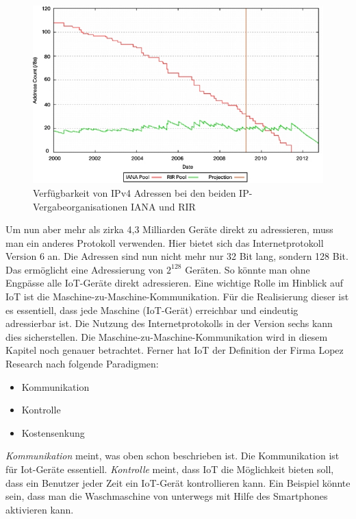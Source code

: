 \begin{figure}
\includegraphics[scale=0.7]{bilder/ipv4cisco} 
\caption{Verfügbarkeit von IPv4 Adressen bei den beiden IP-Vergabeorganisationen IANA und RIR \cite{cisco}}
\label{IPv4}
\end{figure}


Um nun aber mehr als zirka 4,3 Milliarden Geräte direkt zu adressieren, muss man ein anderes Protokoll verwenden. Hier bietet sich das Internetprotokoll Version 6 an. Die Adressen sind nun nicht mehr nur 32 Bit lang, sondern 128 Bit. Das ermöglicht eine Adressierung von $2^{128}$ Geräten. So könnte man ohne Engpässe alle IoT-Geräte direkt adressieren. 
Eine wichtige Rolle im Hinblick auf IoT ist die Maschine-zu-Maschine-Kommunikation. Für die Realisierung dieser ist es essentiell, dass jede Maschine (IoT-Gerät) erreichbar und eindeutig adressierbar ist. Die Nutzung des Internetprotokolls in der Version sechs kann dies sicherstellen. Die Maschine-zu-Maschine-Kommunikation wird in diesem Kapitel noch genauer betrachtet.     
Ferner hat IoT der Definition der Firma Lopez Research nach folgende Paradigmen:
\begin{itemize}
\item Kommunikation
\item Kontrolle
\item Kostensenkung
\end{itemize} 
\textit{Kommunikation} meint, was oben schon beschrieben ist. Die Kommunikation ist für Iot-Geräte essentiell. \textit{Kontrolle} meint, dass IoT die Möglichkeit bieten soll, dass ein Benutzer jeder Zeit ein IoT-Gerät kontrollieren kann. Ein Beispiel könnte sein, dass man die Waschmaschine von unterwegs mit Hilfe des Smartphones aktivieren kann. 

\cite{cisco}
